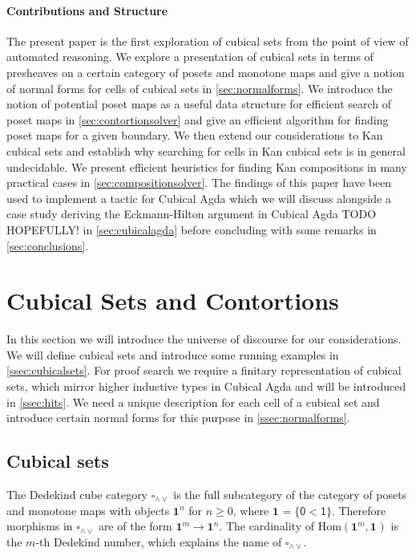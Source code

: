 \documentclass{llncs}
\newcommand{\join}{\wedge}
\newcommand{\meet}{\vee}
\newcommand{\dedekind}{\square_{\join \meet}}
\newcommand{\pint}[1]{\mathbf{1}^{#1}}
\newcommand{\izero}{\mathsf{0}}
\newcommand{\ione}{\mathsf{1}}
\renewcommand{\hom}[2]{\text{Hom}({#1} , {#2})}
\begin{document}
\paragraph*{Contributions and Structure}

The present paper is the first exploration of cubical sets from the point of
view of automated reasoning. We explore a presentation of cubical sets in terms of
presheaves on a certain category of posets and monotone maps and give a notion
of normal forms for cells of cubical sets in \autoref{sec:normalforms}. We
introduce the notion of potential poset maps as a useful data structure for
efficient search of poset maps in \autoref{sec:contortionsolver} and give an efficient
algorithm for finding poset maps for a given boundary.
We then extend our considerations to Kan cubical sets and establish why searching for
cells in Kan cubical sets is in general undecidable. We present efficient heuristics for
finding Kan compositions in many practical cases in
\autoref{sec:compositionsolver}. The findings of this paper have been used to
implement a tactic for Cubical Agda which we will discuss alongside a case study
deriving the Eckmann-Hilton argument in Cubical Agda TODO HOPEFULLY! in
\autoref{sec:cubicalagda} before concluding with some remarks in
\autoref{sec:conclusions}.


\section{Cubical Sets and Contortions}
\label{sec:normalforms}

In this section we will introduce the universe of discourse for our
considerations. We will define cubical sets and introduce some running examples
in \autoref{ssec:cubicalsets}. For proof search we require a finitary
representation of cubical sets, which mirror higher inductive types in Cubical
Agda and will be introduced in \autoref{ssec:hits}. We need a unique description for each cell of
a cubical set and introduce certain normal forms for this purpose in
\autoref{ssec:normalforms}.

\subsection{Cubical sets}
\label{ssec:cubicalsets}

The Dedekind cube category $\dedekind$ is the full subcategory of the category
of posets and monotone maps with objects $\pint{n}$ for $n \geq 0$, where $\pint{}
= \{ \izero < \ione \}$. Therefore morphisms in $\dedekind$ are of
the form $\pint{m} \to \pint{n}$. The cardinality of $\hom{\pint{m}}{\pint{}}$ is the
$m$-th Dedekind number, which explains the name of $\dedekind$.
\end{document}
